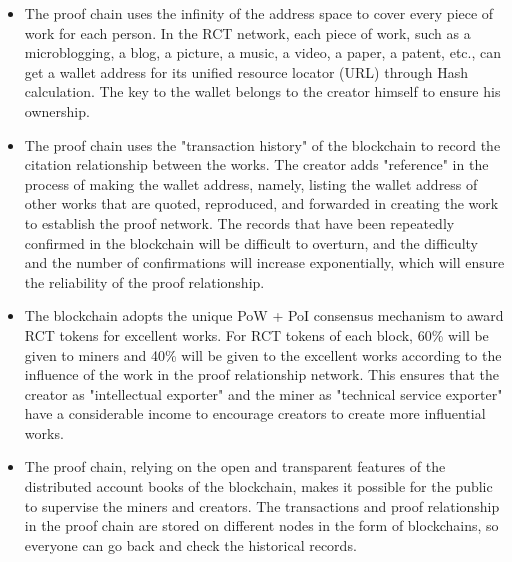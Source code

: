 \documentclass[a4paper,oneside,openany]{tufte-book}
\begin{document}
\begin{itemize}
  \item The proof chain uses the infinity of the address space to cover every piece of work for each person. In the RCT network, each piece of work, such as a microblogging, a blog, a picture, a music, a video, a paper, a patent, etc., can get a wallet address for its unified resource locator (URL) through Hash calculation. The key to the wallet belongs to the creator himself to ensure his ownership.
  \item The proof chain uses the "transaction history" of the blockchain to record the citation relationship between the works. The creator adds "reference" in the process of making the wallet address, namely, listing the wallet address of other works that are quoted, reproduced, and forwarded in creating the work to establish the proof network. The records that have been repeatedly confirmed in the blockchain will be difficult to overturn, and the difficulty and the number of confirmations will increase exponentially, which will ensure the reliability of the proof relationship.
  \item The blockchain adopts the unique PoW + PoI consensus mechanism to award RCT tokens for excellent works. For RCT tokens of each block, 60\% will be given to miners and 40\% will be given to the excellent works according to the influence of the work in the proof relationship network. This ensures that the creator as "intellectual exporter" and the miner as "technical service exporter" have a considerable income to encourage creators to create more influential works.
  \item The proof chain, relying on the open and transparent features of the distributed account books of the blockchain, makes it possible for the public to supervise the miners and creators. The transactions and proof relationship in the proof chain are stored on different nodes in the form of blockchains, so everyone can go back and check the historical records.



\end{itemize}
\end{document}
